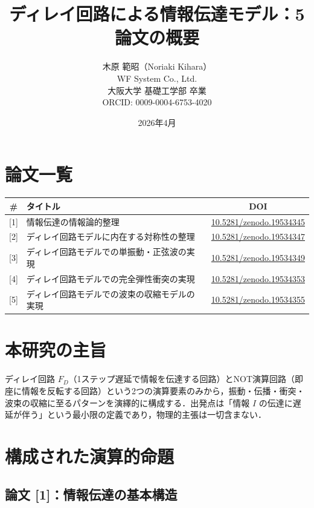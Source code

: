 \documentclass[12pt,a4paper]{ltjsarticle}
\title{ディレイ回路による情報伝達モデル：5論文の概要}
\author{木原 範昭（Noriaki Kihara）\\
WF System Co., Ltd.\\
大阪大学 基礎工学部 卒業\\
ORCID: 0009-0004-6753-4020}
\date{2026年4月}
\begin{document}
\maketitle

\section*{論文一覧}

\begin{table}[h]
\centering
\begin{tabular}{clc}
\toprule
\# & タイトル & DOI \\
\midrule
{[1]} & 情報伝達の情報論的整理 & \href{https://doi.org/10.5281/zenodo.19534345}{10.5281/zenodo.19534345} \\
{[2]} & ディレイ回路モデルに内在する対称性の整理 & \href{https://doi.org/10.5281/zenodo.19534347}{10.5281/zenodo.19534347} \\
{[3]} & ディレイ回路モデルでの単振動・正弦波の実現 & \href{https://doi.org/10.5281/zenodo.19534349}{10.5281/zenodo.19534349} \\
{[4]} & ディレイ回路モデルでの完全弾性衝突の実現 & \href{https://doi.org/10.5281/zenodo.19534353}{10.5281/zenodo.19534353} \\
{[5]} & ディレイ回路モデルでの波束の収縮モデルの実現 & \href{https://doi.org/10.5281/zenodo.19534355}{10.5281/zenodo.19534355} \\
\bottomrule
\end{tabular}
\end{table}

\section*{本研究の主旨}

ディレイ回路 $F_D$（1ステップ遅延で情報を伝達する回路）とNOT演算回路（即座に情報を反転する回路）という2つの演算要素のみから，振動・伝播・衝突・波束の収縮に至るパターンを演繹的に構成する．出発点は「情報 $I$ の伝達に遅延が伴う」という最小限の定義であり，物理的主張は一切含まない．

\section*{構成された演算的命題}

\subsection*{論文 [1]：情報伝達の基本構造}
\end{document}
